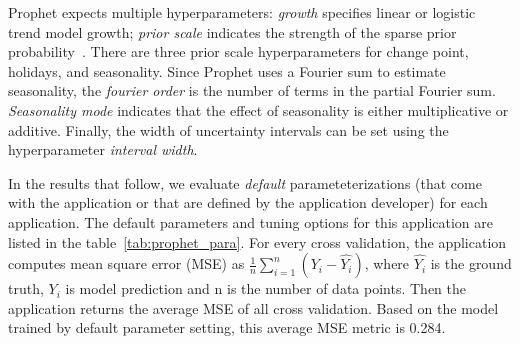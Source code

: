 
Prophet expects multiple hyperparameters: \textit{growth} specifies linear or logistic trend model growth; \textit{prior scale} indicates the strength of the 
sparse prior probability~\cite{ref:sparse_prior}. 
There are three prior scale hyperparameters for change point, holidays, and seasonality. 
Since Prophet uses a Fourier sum to estimate seasonality, 
the \textit{fourier order} is the number of terms in the partial Fourier 
sum. \textit{Seasonality mode} indicates that the effect of seasonality is either 
multiplicative or additive. Finally, the width of uncertainty intervals 
can be set using the hyperparameter \textit{interval width}.

In the results that follow, we evaluate \textit{default} parameteterizations (that come with 
the application or that are defined by the application developer) for each application.  
The default parameters and tuning options for this application are listed in the table~\ref{tab:prophet_para}. For every cross validation, the application computes mean square error (MSE) as $\frac{1}{n}\sum_{i=1}^{n}(Y_i - \hat{Y_i})$, where $\hat{Y_i}$ is the ground truth, $Y_i$ is model prediction and n is the number of data points. Then the application returns the average MSE of all cross validation. Based on the model trained by default parameter setting, this average MSE metric is 0.284.

\begin{table}[t]
\centering
\scriptsize
{}
\caption{The selected configurable hyperparameters of Prophet. The default value and tuning options are listed. 
\label{tab:prophet_para}}
\end{table}


